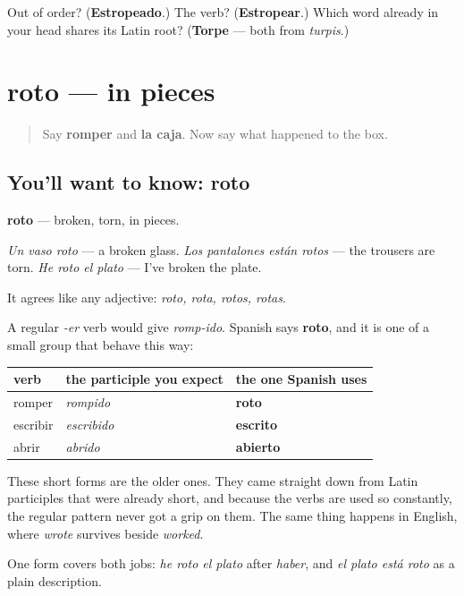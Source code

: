 \begin{tcolorbox}[breakable,colback=teal!4,colframe=teal!35!black,title={Before you move on}]
Out of order? (\textbf{Estropeado}.) The verb? (\textbf{Estropear}.) Which word already in your head shares its Latin root? (\textbf{Torpe} — both from \emph{turpis}.)
\end{tcolorbox}
\section[roto]{roto — in pieces}

\label{lesson:ES-C448-roto}



\begin{quote}
Say \textbf{romper} and \textbf{la caja}. Now say what happened to the box.
\end{quote}

\subsection*{You'll want to know: roto}
\textbf{roto} — broken, torn, in pieces.

\emph{Un vaso roto} — a broken glass. \emph{Los pantalones están rotos} — the trousers are torn. \emph{He roto el plato} — I've broken the plate.

It agrees like any adjective: \emph{roto, rota, rotos, rotas}.

\begin{grammarlens}[title={Grammar Lens: the participle that lost its middle}]
A regular \emph{-er} verb would give \emph{romp-ido}. Spanish says \textbf{roto}, and it is one of a small group that behave this way:

\noindent
\begin{tabularx}{\linewidth}{@{}>{\raggedright\arraybackslash}X>{\raggedright\arraybackslash}X>{\raggedright\arraybackslash}X@{}}
\toprule
\textbf{verb} & \textbf{the participle you expect} & \textbf{the one Spanish uses} \\
\midrule
romper & \emph{rompido} & \textbf{roto} \\
escribir & \emph{escribido} & \textbf{escrito} \\
abrir & \emph{abrido} & \textbf{abierto} \\
\bottomrule
\end{tabularx}

These short forms are the older ones. They came straight down from Latin participles that were already short, and because the verbs are used so constantly, the regular pattern never got a grip on them. The same thing happens in English, where \emph{wrote} survives beside \emph{worked}.

One form covers both jobs: \emph{he roto el plato} after \emph{haber}, and \emph{el plato está roto} as a plain description.
\end{grammarlens}

